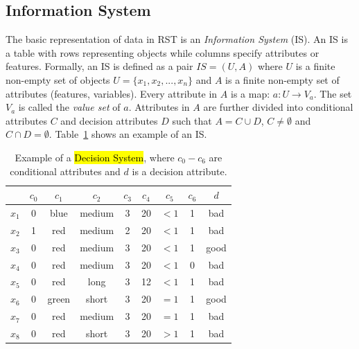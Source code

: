 \documentclass[number,preprint,review,12pt]{elsarticle}
\begin{document}
  
\subsection{Information System}
  The basic representation of data in RST is an \emph{Information System} (IS). An IS is a table with rows
  representing objects while columns specify attributes or features. Formally, an IS is defined as a pair
  $IS=(U,A)$ where $U$ is a finite non-empty set of objects $U=\lbrace x_1,x_2,...,x_n\rbrace$ and $A$ is a 
  finite non-empty set
  of attributes (features, variables). Every attribute in $A$ is a map: $a: U \rightarrow V_a$. The set $V_a$ is
  called the \textit{value set} of $a$. Attributes in $A$ are further divided into conditional attributes $C$ and 
  decision attributes $D$ such that $A=C \cup D$, $C \neq \emptyset$ and $C \cap D =\emptyset$. 
  Table~\ref{tab_IS} shows an example of an IS.
  
 \begin{table}[htb]
		\caption{Example of a \hl{Decision System}, where $c_0-c_6$ are conditional attributes and $d$ is a decision attribute.} \label{tab_IS}
		\centering
 	\begin{tabular}{c||c|c|c|c|c|c|c||c}
 			  & $c_0$ & $c_1$ & $c_2$ &  $c_3$ & $c_4$ & $c_5$ &  $c_6$ & $d$ \\
 		\hline \hline
		$x_1$ & 0 & blue  & medium & 3 & 20 & $<1$  & 1 & bad   \\
		$x_2$ & 1 & red   & medium & 2 & 20 & $<1$  & 1 & bad   \\
		$x_3$ & 0 & red   & medium & 3 & 20 & $<1$  & 1 & good   \\
		$x_4$ & 0 & red   & medium & 3 & 20 & $<1$  & 0 & bad   \\
		$x_5$ & 0 & red   & long   & 3 & 12 & $<1$  & 1 & bad   \\
		$x_6$ & 0 & green & short  & 3 & 20 & $=1$  & 1 & good   \\
		$x_7$ & 0 & red   & medium & 3 & 20 & $=1$  & 1 & bad   \\
		$x_8$ & 0 & red   & short  & 3 & 20 & $>1$  & 1 & bad   \\
 	\end{tabular}             
 \end{table}
 
\end{document}
